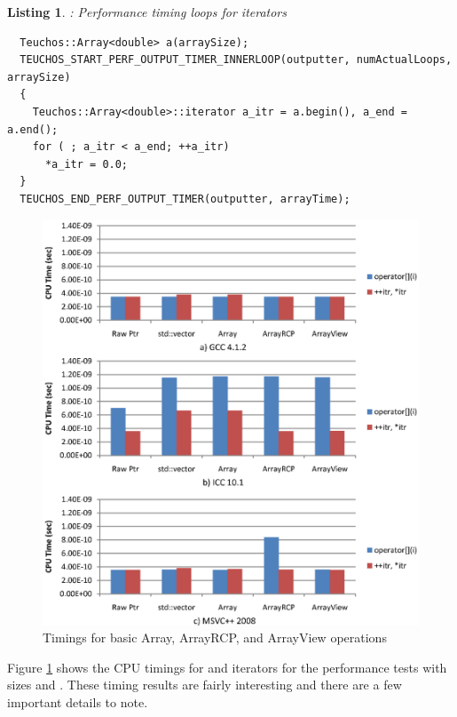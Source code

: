 \documentclass[pdf,ps2pdf,11pt]{SANDreport}
\newtheorem{listing}{Listing}
\begin{document}
\begin{listing}: Performance timing loops for {} iterators \\
\label{listing:Array-iterator-timing}
{\small\begin{verbatim}
  Teuchos::Array<double> a(arraySize); 
  TEUCHOS_START_PERF_OUTPUT_TIMER_INNERLOOP(outputter, numActualLoops, arraySize) 
  { 
    Teuchos::Array<double>::iterator a_itr = a.begin(), a_end = a.end(); 
    for ( ; a_itr < a_end; ++a_itr) 
      *a_itr = 0.0; 
  }
  TEUCHOS_END_PERF_OUTPUT_TIMER(outputter, arrayTime); 
\end{verbatim}}
\end{listing}


{\bsinglespace
\begin{figure}
\begin{center}
\includegraphics*[angle=0,scale=1.00]{ArrayTimings}
\end{center}
\caption{
\label{fig:ArrayTimings}
Timings for basic Array, ArrayRCP, and ArrayView operations}
\end{figure}
\esinglespace}


Figure {}\ref{fig:ArrayTimings} shows the CPU timings for
{} and iterators for the performance tests
with sizes {} and {}.
These timing results are fairly interesting and there are a few
important details to note.
\end{document}
